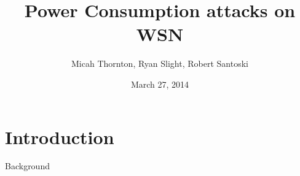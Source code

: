 \documentclass{beamer}
\title[Power Consumption Attacks on Wireless Sensor Networks]{Power Consumption attacks on WSN}
\author{Micah Thornton, Ryan Slight, Robert Santoski}
\institute{Southern Methodist University}
\date{March 27, 2014}
\begin{document}
\begin{frame}
\titlepage
\end{frame}

\begin{frame}
\tableofcontents
\end{frame}

\section{Introduction}
\begin{frame}{Background}

\end{frame}
\end{document}
